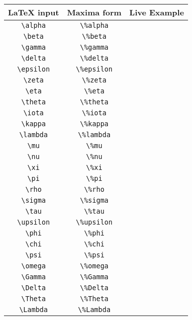 \begin{tabular}{|c|c|c|}
\hline
LaTeX input & Maxima form & Live Example \\
\hline
\verb|\alpha| & \verb|\%alpha| & \ue{\verb|\alpha|} \\
\verb|\beta| & \verb|\%beta| & \ue{\verb|\beta|} \\
\verb|\gamma| & \verb|\%gamma| & \ue{\verb|\gamma|} \\
\verb|\delta| & \verb|\%delta| & \ue{\verb|\delta|} \\
\verb|\epsilon| & \verb|\%epsilon| & \ue{\verb|\epsilon|} \\
\verb|\zeta| & \verb|\%zeta| & \ue{\verb|\zeta|} \\
\verb|\eta| & \verb|\%eta| & \ue{\verb|\eta|} \\
\verb|\theta| & \verb|\%theta| & \ue{\verb|\theta|} \\
\verb|\iota| & \verb|\%iota| & \ue{\verb|\iota|} \\
\verb|\kappa| & \verb|\%kappa| & \ue{\verb|\kappa|} \\
\verb|\lambda| & \verb|\%lambda| & \ue{\verb|\lambda|} \\
\verb|\mu| & \verb|\%mu| & \ue{\verb|\mu|} \\
\verb|\nu| & \verb|\%nu| & \ue{\verb|\nu|} \\
\verb|\xi| & \verb|\%xi| & \ue{\verb|\xi|} \\
\verb|\pi| & \verb|\%pi| & \ue{\verb|\pi|} \\
\verb|\rho| & \verb|\%rho| & \ue{\verb|\rho|} \\
\verb|\sigma| & \verb|\%sigma| & \ue{\verb|\sigma|} \\
\verb|\tau| & \verb|\%tau| & \ue{\verb|\tau|} \\
\verb|\upsilon| & \verb|\%upsilon| & \ue{\verb|\upsilon|} \\
\verb|\phi| & \verb|\%phi| & \ue{\verb|\phi|} \\
\verb|\chi| & \verb|\%chi| & \ue{\verb|\chi|} \\
\verb|\psi| & \verb|\%psi| & \ue{\verb|\psi|} \\
\verb|\omega| & \verb|\%omega| & \ue{\verb|\omega|} \\
\verb|\Gamma| & \verb|\%Gamma| & \ue{\verb|\Gamma|} \\
\verb|\Delta| & \verb|\%Delta| & \ue{\verb|\Delta|} \\
\verb|\Theta| & \verb|\%Theta| & \ue{\verb|\Theta|} \\
\verb|\Lambda| & \verb|\%Lambda| & \ue{\verb|\Lambda|} \\

\end{tabular}
